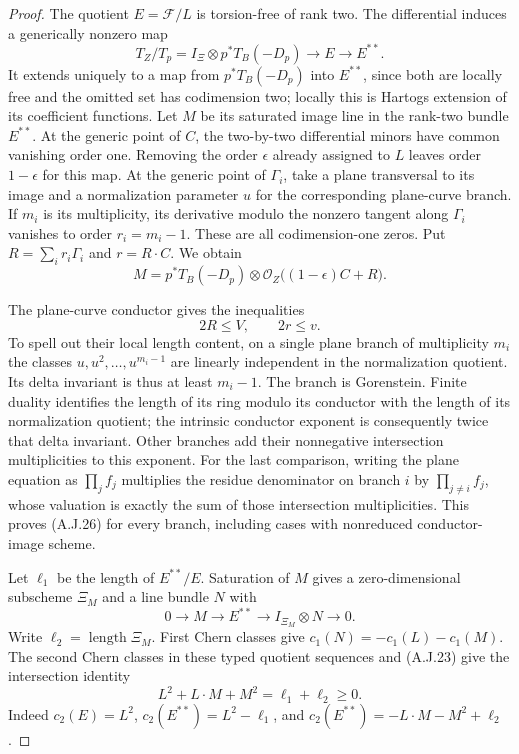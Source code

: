 \begin{proof}
The quotient $E=\mathcal F/L$ is torsion-free of rank
two. The differential induces a generically nonzero map
\[
 T_Z/T_p=I_\Xi\otimes p^*T_B(-D_p)
                    \longrightarrow E\longrightarrow E^{**}.
\]
It extends uniquely to a map from $p^*T_B(-D_p)$ into
$E^{**}$, since both are locally free and the omitted
set has codimension two; locally this is Hartogs
extension of its coefficient functions.
Let $M$ be its saturated image line in the rank-two
bundle $E^{**}$. At the generic point of $C$, the
two-by-two differential minors have common vanishing
order one. Removing the order $\epsilon$ already
assigned to $L$ leaves order $1-\epsilon$ for this map.
At the generic point of $\Gamma_i$, take a plane transversal
to its image and a normalization parameter $u$ for the
corresponding plane-curve branch. If $m_i$ is its
multiplicity, its derivative modulo the nonzero tangent
along $\Gamma_i$ vanishes to order $r_i=m_i-1$.
These are all codimension-one zeros. Put
$R=\sum_i r_i\Gamma_i$ and $r=R\cdot C$. We obtain
\[
 M=p^*T_B(-D_p)\otimes
           \mathcal O_Z\bigl((1-\epsilon)C+R\bigr).
                                                        \tag{A.J.25}
\]

The plane-curve conductor gives the inequalities
\[
 2R\leq V,\qquad 2r\leq v.                      \tag{A.J.26}
\]
To spell out their local length content, on a single
plane branch of multiplicity $m_i$ the classes
$u,u^2,\ldots,u^{m_i-1}$ are linearly independent in
the normalization quotient. Its delta invariant is thus
at least $m_i-1$. The branch is Gorenstein. Finite
duality identifies the length of its ring modulo its
conductor with the length of its normalization quotient;
the intrinsic conductor exponent is consequently twice
that delta invariant. Other branches add their
nonnegative intersection multiplicities to this exponent.
For the last comparison, writing the plane equation
as $\prod_j f_j$ multiplies the residue denominator on
branch $i$ by $\prod_{j\ne i}f_j$, whose valuation is
exactly the sum of those intersection multiplicities.
This proves (A.J.26) for every branch, including cases
with nonreduced conductor-image scheme.

Let $\ell_1$ be the length of $E^{**}/E$. Saturation
of $M$ gives a zero-dimensional subscheme $\Xi_M$ and a
line bundle $N$ with
\[
 0\longrightarrow M\longrightarrow E^{**}
       \longrightarrow I_{\Xi_M}\otimes N\longrightarrow0.
\]
Write $\ell_2=\operatorname{length}\Xi_M$.
First Chern classes give $c_1(N)=-c_1(L)-c_1(M)$.
The second Chern classes in these typed quotient
sequences and (A.J.23) give the intersection identity
\[
 L^2+L\cdot M+M^2=\ell_1+\ell_2\geq0.            \tag{A.J.27}
\]
Indeed $c_2(E)=L^2$,
$c_2(E^{**})=L^2-\ell_1$, and
$c_2(E^{**})=-L\cdot M-M^2+\ell_2$.


\end{proof}

